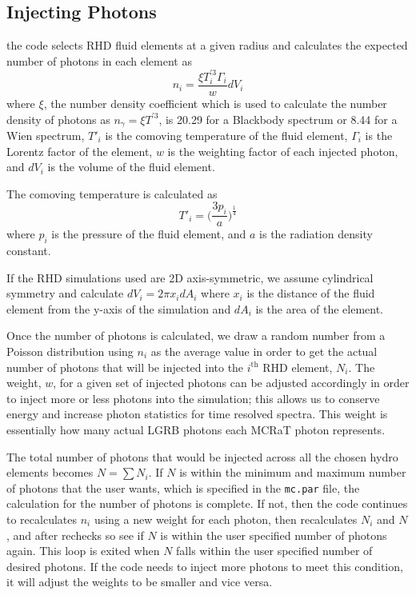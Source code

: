 \documentclass[12pt,a4paper]{article}
\begin{document}
\subsection{Injecting Photons} \label{inj}
the code selects RHD fluid elements at a given radius and calculates the expected number of photons in each element as
\begin{equation} \label{n_density}
n_i=\frac{\xi T_i^{'3}\Gamma_i}{w}dV_i 
\end{equation} 
where $\xi$, the number density coefficient which is used to calculate the number density of photons as $n_\gamma=\xi T^{'3}$, is 20.29 for a Blackbody spectrum or 8.44 for a Wien spectrum, $T'_i$ is the comoving temperature of the fluid element, $\Gamma_i$ is the Lorentz factor of the element, $w$ is the weighting factor of each injected photon, and $dV_i$ is the volume of the fluid element. 
 
The comoving temperature is calculated as
\begin{equation}
T'_i=\big( \frac{3p_i}{a} \big)^\frac{1}{4}
\end{equation}
where $p_i$ is the pressure of the fluid element, and $a$ is the radiation density constant.
 
If the RHD simulations used are 2D axis-symmetric, we assume cylindrical symmetry and calculate $dV_i=2\pi x_idA_i$ where $x_i$ is the distance of the fluid element from the y-axis of the simulation and $dA_i$ is the area of the element. 
 
Once the number of photons is calculated, we draw a random number from a Poisson distribution using $n_i$ as the average value in order to get the actual number of photons that will be injected into the $i^\text{th}$ RHD element, $N_i$. The weight, $w$, for a given set of injected photons can be adjusted accordingly in order to inject more or less photons into the simulation; this allows us to conserve energy and increase photon statistics for time resolved spectra. This weight is essentially how many actual LGRB photons each MCRaT photon represents.

The total number of photons that would be injected across all the chosen hydro elements becomes $N=\sum N_i$. If $N$ is within the minimum and maximum number of photons that the user wants, which is specified in the \texttt{mc.par} file, the calculation for the number of photons is complete. If not, then the code continues to recalculates $n_i$ using a new weight for each photon, then recalculates $N_i$ and $N$, and after rechecks so see if $N$ is within the user specified number of photons again. This loop is exited when $N$ falls within the user specified number of desired photons. If the code needs to inject more photons to meet this condition, it will adjust the weights to be smaller and vice versa.
\end{document}
